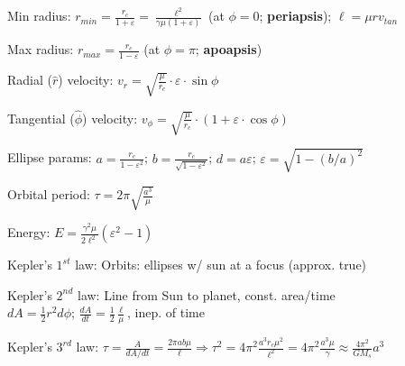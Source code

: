 \documentclass[letterpaper,landscape,10pt]{article}
\newenvironment{mydescription}
{\begin{description}
	\setlength{\itemsep}{0pt}
	\setlength{\parskip}{0pt}
	\setlength{\parsep}{-1pt}}
{\end{description}}
\begin{document}
{\begin{multicols}{4}
\begin{mydescription}
		  \item[Min radius:] $r_{min}=\frac{r_c}{1+\varepsilon}=\frac{\ell^2}{\gamma\mu(1+\varepsilon)}$ (at $\phi=0$; \textbf{periapsis}); $\ell=\mu rv_{tan}$
		  \item[Max radius:] $r_{max}=\frac{r_c}{1-\varepsilon}$ (at $\phi=\pi$; \textbf{apoapsis})
		  \item[Radial ($\hat r$) velocity:]$v_r = \sqrt{\frac{\mu}{r_c}}\cdot\varepsilon\cdot\sin\phi$
		  \item[Tangential ($\hat\phi$) velocity:]$v_\phi = \sqrt{\frac{\mu}{r_c}}\cdot\left(1+\varepsilon\cdot\cos\phi\right)$
		  \item[Ellipse params:] $a=\frac{r_c}{1-\varepsilon^2}$; $b=\frac{r_c}{\sqrt{1-\varepsilon^2}}$; $d=a\varepsilon$; $\varepsilon=\sqrt{1-(b/a)^2}$
		  \item[Orbital period:] $\tau=2\pi\sqrt{\frac{a^3}{\mu}}$
		  \item[Energy:] $E=\frac{\gamma^2\mu}{2\ell^2}(\varepsilon^2-1)$
		  \item[Kepler's $1^{st}$ law:] Orbits: ellipses w/ sun at a focus (approx. true)
		  \item[Kepler's $2^{nd}$ law:] Line from Sun to planet, const. area/time\\
			$dA=\frac{1}{2}r^2d\phi$; $\frac{dA}{dt}=\frac{1}{2}\frac{\ell}{\mu}$, inep. of time
		  \item[Kepler's $3^{rd}$ law:] $\tau=\frac{A}{dA/dt}=\frac{2\pi ab\mu}{\ell} \Rightarrow \tau^2=4\pi^2\frac{a^3r_c\mu^2}{\ell^2}=4\pi^2\frac{a^3\mu}{\gamma}\approx \frac{4\pi^2}{GM_s}a^3$
		\end{mydescription}


\end{multicols}}
\end{document}
